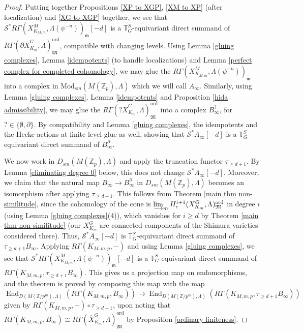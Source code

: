 \documentclass{amsart}
\theoremstyle{remark}
\numberwithin{equation}{subsection}
\newcommand{\Z}{\ZZ}
\newcommand{\ZZ}{{\mathbb Z}}
\newcommand{\cS}{{\mathcal S}}
\DeclareMathOperator{\End}{End}
\newcommand{\ol}{\overline}
\renewcommand{\(}{\left(}
\renewcommand{\)}{\right)}
\begin{document}
\begin{proof}
Putting together Propositions \ref{XP to XGP}, \ref{XM to XP} (after localization) and \ref{XG to XGP} together, we see that $\cS^\ast R\Gamma(X_{K_{M,m}}^M,\Lambda(\psi^{-n}) )_{\mathfrak{m}}[-d]$ is a $\mathbb{T}_G^S$-equivariant direct summand of $R\Gamma(\partial \ol{X}_{K_m}^G,\Lambda)_{\mathfrak{M}}^{\mathrm{ord}}$, compatible with changing levels. Using Lemma \ref{gluing complexes}, Lemma \ref{idempotents} (to handle localizations) and Lemma \ref{perfect complex for completed cohomology}, we may glue the $R\Gamma(X_{K_{M,m}}^M,\Lambda(\psi^{-n}) )_{\mathfrak{m}}$ into a complex in $\mathrm{Mod}_{sm}(M(\Z_p),\Lambda)$ which we will call $A_\infty$. Similarly, using Lemma \ref{gluing complexes}. Lemma \ref{idempotents} and Proposition \ref{hida admissibility}, we may glue the $R\Gamma(?\ol{X}_{K_m}^G,\Lambda)_{\mathfrak{M}}^{\mathrm{ord}}$ into a complex $B_\infty^{?}$, for $?\in \{\emptyset, \partial\}$. By compatibility and Lemma \ref{gluing complexes}, the idempotents and the Hecke actions at finite level glue as well, showing that $\cS^\ast A_\infty[-d]$ is a $\mathbb{T}_G^S$-equivariant direct summand of $B_\infty^\partial$.

\medskip
We now work in $D_{sm}(M(\Z_p),\Lambda)$ and apply the truncation functor $\tau_{\geq d+1}$. By Lemma \ref{eliminating degree 0} below, this does not change $\cS^\ast A_\infty[-d]$. Moreover, we claim that the natural map $B_\infty \to B_\infty^\partial$ in $D_{sm}(M(\Z_p),\Lambda)$ becomes an isomorphism after applying $\tau_{\geq d+1}$. This follows from Theorem \ref{main thm non-similitude}, since the cohomology of the cone is $\varinjlim_m H_c^{i+1}(X_{K_m}^G,\Lambda)_{\mathfrak{M}}^{\mathrm{ord}}$ in degree $i$ (using Lemma \ref{gluing complexes}(4)), which vanishes for $i\geq d$ by Theorem \ref{main thm non-similitude} (our $X_{K_m}^G$ are connected components of the Shimura varieties considered there). Thus, $\cS^\ast A_\infty[-d]$ is $\mathbb{T}_G^S$-equivariant direct summand of $\tau_{\geq d+1}B_\infty$. Applying $R\Gamma(K_{M,m,p},-)$ and using Lemma \ref{gluing complexes}, we see that $\cS^\ast R\Gamma(X_{K_{M,m}}^M,\Lambda(\psi^{-n}) )_{\mathfrak{m}}[-d]$ is a $\mathbb{T}_G^S$-equivariant direct summand of $
R\Gamma( K_{M,m,p}, \tau_{\geq d+1}B_\infty )$.
This gives us a projection map on endomorphisms, and the theorem is proved by composing this map with the map
\[
\End_{D(M(\Z/p^m),\Lambda)}\left( R\Gamma(K_{M,m,p},B_\infty) \right) \to \End_{D(M(\Z/p^m),\Lambda)}\left( R\Gamma(K_{M,m,p},\tau_{\geq d+1}B_\infty ) \right)
\]
given by $R\Gamma(K_{M,m,p},-) \circ \tau_{\geq d+1}$, upon noting that $R\Gamma(K_{M,m,p},B_\infty) \cong R\Gamma(\ol{X}_{K_m}^G,\Lambda)_{\mathfrak{M}}^{\mathrm{ord}}$ by Proposition \ref{ordinary finiteness}.
\end{proof}
\end{document}
